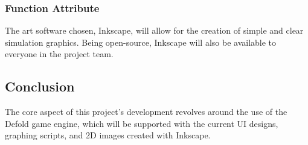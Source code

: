 \documentclass[onecolumn, draftclsnofoot,10pt, compsoc]{IEEEtran}
\begin{document}
\subsubsection{Function Attribute}
The art software chosen, Inkscape, will allow for the creation of simple and clear simulation graphics. Being open-source, Inkscape will also be available to everyone in the project team.


\subsection{Conclusion}
The core aspect of this project's development revolves around the use of the Defold game engine, which will be supported with the current UI designs, graphing scripts, and 2D images created with Inkscape.
\end{document}
